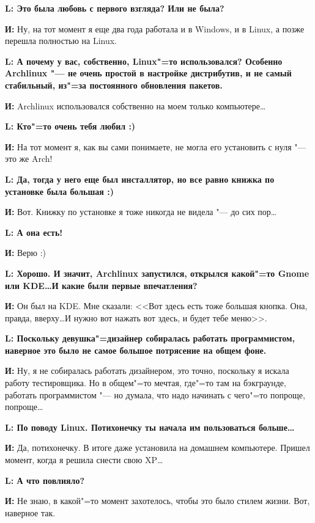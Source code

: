 \documentclass[10pt, a5paper]{article}
\begin{document}
{\noindent \bf L: Это была любовь с первого взгляда? Или не была?}

{\noindent \bf И:} Ну, на тот момент я еще два года работала и в Windows, и в Linux, а позже перешла полностью на Linux.

{\noindent \bf L: А почему у вас, собственно, Linux"=то использовался? Особенно Archlinux "--- не очень простой в настройке дистрибутив, и не самый стабильный, из"=за постоянного обновления пакетов.}

{\noindent \bf И:} Archlinux использовался собственно на моем только компьютере\ldots

{\noindent \bf L: Кто"=то очень тебя любил :)}

{\noindent \bf И:} На тот момент я, как вы сами понимаете, не могла его установить с нуля "--- это же Arch!

{\noindent \bf L: Да, тогда у него еще был инсталлятор, но все равно книжка по установке была большая :)}

{\noindent \bf И:} Вот. Книжку по установке я тоже никогда не видела "--- до сих пор\ldots

{\noindent \bf L: А она есть!}

{\noindent \bf И:} Верю :)

{\noindent \bf L: Хорошо. И значит, Archlinux запустился, открылся какой"=то Gnome или KDE\ldots И какие были первые впечатления?}

{\noindent \bf И:} Он был на KDE. Мне сказали: <<Вот здесь есть тоже большая кнопка. Она, правда, вверху\ldots И нужно вот нажать вот здесь, и будет тебе меню>>.

{\noindent \bf L: Поскольку девушка"=дизайнер собиралась работать программистом, наверное это было не самое большое потрясение на общем фоне.}

{\noindent \bf И:} Ну, я не собиралась работать дизайнером, это точно, поскольку я искала работу тестировщика. Но в общем"=то мечтая, где"=то там на бэкграунде, работать программистом "--- но думала, что надо начинать с чего"=то попроще, попроще\ldots

{\noindent \bf L: По поводу Linux. Потихонечку ты начала им пользоваться больше\ldots}

{\noindent \bf И:} Да, потихонечку. В итоге даже установила на домашнем компьютере. Пришел момент, когда я решила снести свою XP\ldots

{\noindent \bf L: А что повлияло?}

{\noindent \bf И:} Не знаю, в какой"=то момент захотелось, чтобы это было стилем жизни. Вот, наверное так.
\end{document}

